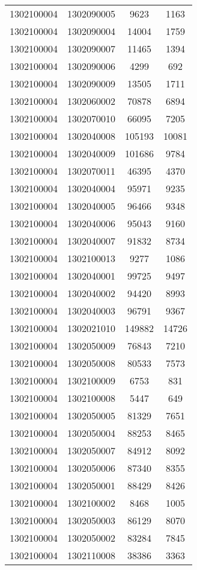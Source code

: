 \begin{longtable}[h]{llcc}
		1302100004 & 1302090005 & 9623 & 1163\\
		1302100004 & 1302090004 & 14004 & 1759\\
		1302100004 & 1302090007 & 11465 & 1394\\
		1302100004 & 1302090006 & 4299 & 692\\
		1302100004 & 1302090009 & 13505 & 1711\\
		1302100004 & 1302060002 & 70878 & 6894\\
		1302100004 & 1302070010 & 66095 & 7205\\
		1302100004 & 1302040008 & 105193 & 10081\\
		1302100004 & 1302040009 & 101686 & 9784\\
		1302100004 & 1302070011 & 46395 & 4370\\
		1302100004 & 1302040004 & 95971 & 9235\\
		1302100004 & 1302040005 & 96466 & 9348\\
		1302100004 & 1302040006 & 95043 & 9160\\
		1302100004 & 1302040007 & 91832 & 8734\\
		1302100004 & 1302100013 & 9277 & 1086\\
		1302100004 & 1302040001 & 99725 & 9497\\
		1302100004 & 1302040002 & 94420 & 8993\\
		1302100004 & 1302040003 & 96791 & 9367\\
		1302100004 & 1302021010 & 149882 & 14726\\
		1302100004 & 1302050009 & 76843 & 7210\\
		1302100004 & 1302050008 & 80533 & 7573\\
		1302100004 & 1302100009 & 6753 & 831\\
		1302100004 & 1302100008 & 5447 & 649\\
		1302100004 & 1302050005 & 81329 & 7651\\
		1302100004 & 1302050004 & 88253 & 8465\\
		1302100004 & 1302050007 & 84912 & 8092\\
		1302100004 & 1302050006 & 87340 & 8355\\
		1302100004 & 1302050001 & 88429 & 8426\\
		1302100004 & 1302100002 & 8468 & 1005\\
		1302100004 & 1302050003 & 86129 & 8070\\
		1302100004 & 1302050002 & 83284 & 7845\\
		1302100004 & 1302110008 & 38386 & 3363\\

\end{longtable}
